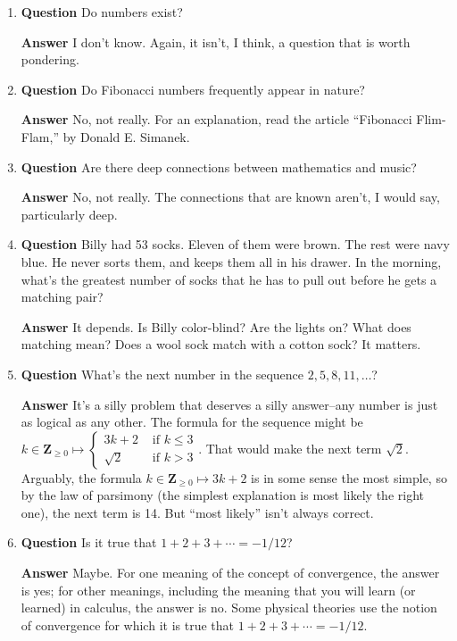 \documentclass[12pt]{article}
\newcounter{ex}\setcounter{ex}{0}
\newcounter{cd}\setcounter{cd}{24}
\begin{document}
\begin{enumerate}
\item  \textbf{Question} Do numbers exist?

  \textbf{Answer} I don't know. Again, it isn't, I think, a question that is worth pondering.

\item  \textbf{Question} Do Fibonacci numbers frequently appear in nature?

\textbf{Answer}  No, not really.  For an explanation, read the article ``Fibonacci Flim-Flam,'' by Donald E. Simanek.

\item  \textbf{Question} Are there deep connections between mathematics and music? 

  \textbf{Answer}  No, not really. The connections that are known aren't, I would say, particularly deep.

\item  \textbf{Question}  Billy had 53 socks.  Eleven of them were brown.  The rest were navy blue.  He never sorts them, and keeps them all in his drawer.  In the morning, what's the greatest number of socks that he has to pull out before he gets a matching pair?

  \textbf{Answer} It depends. Is Billy color-blind?  Are the lights on? What does matching mean? Does a wool sock match with a cotton sock? It matters.

\item  \textbf{Question} What's the next number in the sequence  \(2,5,8,11, \dots \)?

  \textbf{Answer}  It's a silly problem that deserves a silly answer--any number is just as logical as any other. 
The formula for the sequence might be \(k \in \mathbf{Z}_{\geq 0} \mapsto \begin{cases} 3 k +2 & \mbox{ if } k \leq 3
 \\ \sqrt{2} & \mbox{ if } k >  3 \end{cases} \). That would make the next term \(\sqrt{2} \). 
 Arguably, the formula  \(k \in \mathbf{Z}_{\geq 0}  \mapsto 3 k +2 \) is in some 
 sense the most simple, so by the law of parsimony 
 (the simplest explanation is most likely the right one), the next 
 term is 14. But ``most likely'' isn't always correct.

\item  \textbf{Question} Is it true that \(1 + 2 + 3 + \cdots = -1/12\)?

  \textbf{Answer}  Maybe. For one meaning of the concept of convergence, the answer is yes; for other meanings, including the meaning that you will learn (or learned)  in calculus, the answer is no.  Some physical theories use the notion of convergence for which it is true that \(1 + 2 + 3 + \cdots = -1/12\).


\end{enumerate}
\end{document}
